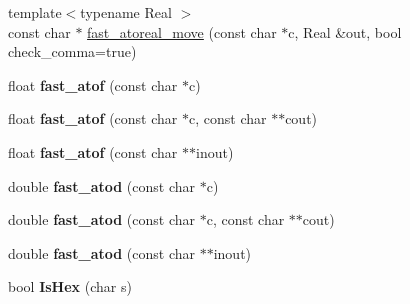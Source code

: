 \begin{DoxyCompactItemize}
\item 
{\footnotesize template$<$typename Real $>$ }\\const char $\ast$ \hyperlink{namespace_assimp_a99179da009833bb3b0b72b469edf6370}{fast\+\_\+atoreal\+\_\+move} (const char $\ast$c, Real \&out, bool check\+\_\+comma=true)
\item 
\hypertarget{namespace_assimp_acbb007b2ed4352f7d41c462828c455e4}{float {\bfseries fast\+\_\+atof} (const char $\ast$c)}\label{namespace_assimp_acbb007b2ed4352f7d41c462828c455e4}

\item 
\hypertarget{namespace_assimp_a4b67db79e3284e835b5be9bc0c1e4a2a}{float {\bfseries fast\+\_\+atof} (const char $\ast$c, const char $\ast$$\ast$cout)}\label{namespace_assimp_a4b67db79e3284e835b5be9bc0c1e4a2a}

\item 
\hypertarget{namespace_assimp_aa9efe47f47767fd6f9f4cb9162279638}{float {\bfseries fast\+\_\+atof} (const char $\ast$$\ast$inout)}\label{namespace_assimp_aa9efe47f47767fd6f9f4cb9162279638}

\item 
\hypertarget{namespace_assimp_a1959fe3a6e774623cd8044c67936ce9d}{double {\bfseries fast\+\_\+atod} (const char $\ast$c)}\label{namespace_assimp_a1959fe3a6e774623cd8044c67936ce9d}

\item 
\hypertarget{namespace_assimp_a02020d6e063cd781c592b92da2d6a6f4}{double {\bfseries fast\+\_\+atod} (const char $\ast$c, const char $\ast$$\ast$cout)}\label{namespace_assimp_a02020d6e063cd781c592b92da2d6a6f4}

\item 
\hypertarget{namespace_assimp_ad6f53b0143eb1df51a745c04e9e5dec7}{double {\bfseries fast\+\_\+atod} (const char $\ast$$\ast$inout)}\label{namespace_assimp_ad6f53b0143eb1df51a745c04e9e5dec7}

\item 
\hypertarget{namespace_assimp_a4ecbaed1f4bde28a7774b4b8dc31723d}{bool {\bfseries Is\+Hex} (char s)}\label{namespace_assimp_a4ecbaed1f4bde28a7774b4b8dc31723d}


\end{DoxyCompactItemize}
